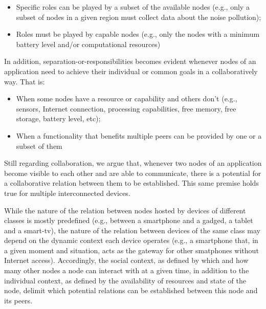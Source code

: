 \begin{itemize}
	\item Specific roles can be played by a subset of the available nodes (e.g., only a subset of nodes in a given region must collect data about the noise pollution);
	
	\item Roles must be played by capable nodes (e.g., only the nodes with a minimum battery level and/or computational resources)
\end{itemize}


In addition, separation-or-responsibilities becomes evident whenever nodes of an application need to achieve their individual or common goals in a collaboratively way. That is:

\begin{itemize}
	
	\item When some nodes have a resource or capability and others don't (e.g., sensors, Internet connection, processing capabilities, free memory, free storage, battery level, etc);
	
	\item When a functionality that benefits multiple peers can be provided by one or a subset of them

\end{itemize}


Still regarding collaboration, we argue that, whenever two nodes of an application become visible to each other and are able to communicate, there is a potential for a collaborative relation between them to be established. 
This same premise holds true for multiple interconnected devices. 

While the nature of the relation between nodes hosted by devices of different classes is mostly predefined (e.g., between a smartphone and a gadged, a tablet and a smart-tv), the nature of the relation between devices of the same class may depend on the dynamic context each device operates (e.g., a smartphone that, in a given moment and situation, acts as the gateway for other smatphones without Internet access). 
Accordingly, the social context, as defined by which and how many other nodes a node can interact with at a given time, in addition to the individual context, as defined by the availability of resources and state of the node, delimit which potential relations can be established between this node and its peers. 

